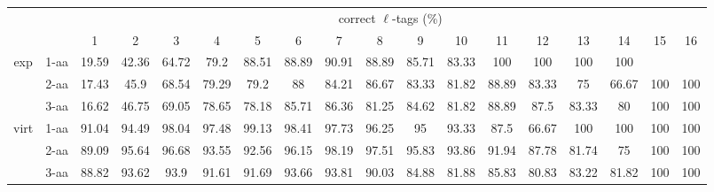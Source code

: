 \documentclass{article}
\begin{document}
\begin{landscape}
\begin{table}[h]\tiny
\vspace{3mm}
{\centering
\begin{center}
\begin{tabular}{|c|l|c|c|c|c|c|c|c|c|c|c|c|c|c|c|c|c|}
  \hline
  \multicolumn{2}{|c|}{ } & \multicolumn{ 16 }{|c|}{ correct $\ell$-tags (\%)} \\
  \cline{3- 18}
  \multicolumn{2}{|c|}{ }  & 1 & 2 & 3 & 4 & 5 & 6 & 7 & 8 & 9 & 10 & 11 & 12 & 13 & 14 & 15 & 16\\
  \hline
  \multirow{3}{*}{exp}
&  1-aa  & 19.59 & 42.36 & 64.72 & 79.2 & 88.51 & 88.89 & 90.91 & 88.89 & 85.71 & 83.33 & 100 & 100 & 100 & 100 &  & \\
&  2-aa  & 17.43 & 45.9 & 68.54 & 79.29 & 79.2 & 88 & 84.21 & 86.67 & 83.33 & 81.82 & 88.89 & 83.33 & 75 & 66.67 & 100 & 100\\
&  3-aa  & 16.62 & 46.75 & 69.05 & 78.65 & 78.18 & 85.71 & 86.36 & 81.25 & 84.62 & 81.82 & 88.89 & 87.5 & 83.33 & 80 & 100 & 100\\
 \hline
  \multirow{3}{*}{virt} 
&  1-aa  & 91.04 & 94.49 & 98.04 & 97.48 & 99.13 & 98.41 & 97.73 & 96.25 & 95 & 93.33 & 87.5 & 66.67 & 100 & 100 & 100 & 100\\
&  2-aa  & 89.09 & 95.64 & 96.68 & 93.55 & 92.56 & 96.15 & 98.19 & 97.51 & 95.83 & 93.86 & 91.94 & 87.78 & 81.74 & 75 & 100 & 100\\
&  3-aa  & 88.82 & 93.62 & 93.9 & 91.61 & 91.69 & 93.66 & 93.81 & 90.03 & 84.88 & 81.88 & 85.83 & 80.83 & 83.22 & 81.82 & 100 & 100\\
 \hline
\end{tabular}
\end{center}
\par}
\centering
\vspace{3mm}
\end{table}


\end{landscape}
\end{document}
